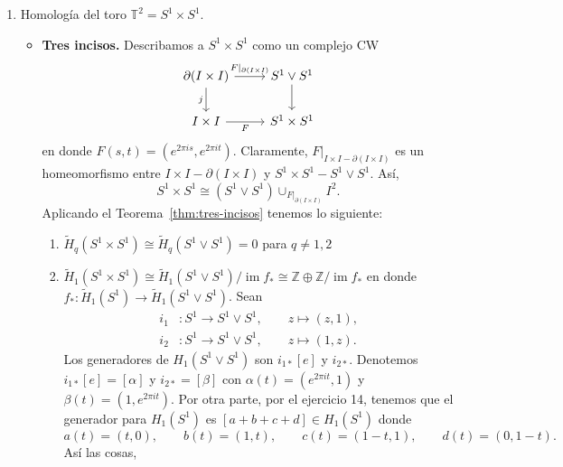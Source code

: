 \documentclass[11pt,a4paper]{article}
\theoremstyle{plain}
\theoremstyle{definition}
\theoremstyle{remark}
\newcommand{\ZZ}{\mathbb Z}
\DeclareMathOperator{\im}{im}
\begin{document}
\begin{enumerate}[label=\arabic*.,leftmargin=*]
\begin{enumerate}[label=\alph*)]
Se tiene la sucesión de Mayer--Vietoris:
\[
\begin{aligned}
\cdots\to H_q(\{*\},\{*\})\to H_q(A,\{*\})\oplus H_q(S_1,\{*\})&\to H_q(X,\{*\})\\
&\to H_{q-1}(\{*\},\{*\})\to\cdots
\end{aligned}
\]
Por lo tanto, se tiene el isomorfismo
$H_q\left(\bigvee_{n-1}S^1,\{*\}\right)\oplus H_q(S^1,\{*\})\cong H_q\left(\bigvee_nS^1,\{*\}\right)$.
De esta forma,
\[
\tilde H_q\left(\bigvee_nS^1\right)=\tilde H_q\left(\bigvee_{n-1}S^1\right)\oplus\tilde H_q(S_1)
=\bigoplus_{n-1}\tilde H_q(S^1)\oplus\tilde H_q(S^1)
=\bigoplus_n\tilde H_q(S^1).
\]
\item Homología del toro $\mathbb T^2=S^1\times S^1$.
\begin{itemize}
\item \textbf{Tres incisos.} Describamos a $S^1\times S^1$ como un complejo
CW
\[
\begin{tikzcd}
\partial(I\times I) \arrow[r,"F|_{\partial(I\times I)}"] \arrow[d,swap,"j"] & S^1\vee S^1 \arrow[d] \\
I\times I \arrow[r,swap,"F"] & S^1\times S^1
\end{tikzcd}
\]
en donde $F(s,t)=(e^{2\pi is},e^{2\pi it})$. Claramente,
$F|_{I\times I-\partial(I\times I)}$ es un homeomorfismo entre
$I\times I-\partial(I\times I)$ y $S^1\times S^1-S^1\vee S^1$. Así,
\[
S^1\times S^1\cong(S^1\vee S^1)\cup_{F|_{\partial(I\times I)}}I^2.
\]
Aplicando el Teorema~\ref{thm:tres-incisos} tenemos lo siguiente:
\begin{enumerate}[label=\arabic*)]
\item $\tilde H_q(S^1\times S^1)\cong\tilde H_q(S^1\vee S^1)=0$ para
$q\ne1,2$
\item $\tilde H_1(S^1\times S^1)\cong\tilde H_1(S^1\vee S^1)/\im f_*\cong\ZZ\oplus\ZZ/\im f_*$
en donde $f_*:\tilde H_1(S^1)\to\tilde H_1(S^1\vee S^1)$. Sean
\[
\begin{aligned}
i_1&:S^1\to S^1\vee S^1, \qquad z\mapsto(z,1),\\
i_2&:S^1\to S^1\vee S^1, \qquad z\mapsto(1,z).
\end{aligned}
\]
Los generadores de $H_1(S^1\vee S^1)$ son $i_{1*}[e]$ y $i_{2*}$. Denotemos
$i_{1*}[e]=[\alpha]$ y $i_{2*}=[\beta]$ con $\alpha(t)=(e^{2\pi it},1)$ y
$\beta(t)=(1,e^{2\pi it})$. Por otra parte, por el ejercicio 14, tenemos
que el generador para $H_1(S^1)$ es $[a+b+c+d]\in H_1(S^1)$ donde
\[
a(t)=(t,0), \qquad b(t)=(1,t), \qquad c(t)=(1-t,1), \qquad d(t)=(0,1-t).
\]
Así las cosas,
\[
\begin{aligned}

\end{aligned}\]
\end{enumerate}
\end{itemize}
\end{enumerate}
\end{enumerate}
\end{document}
